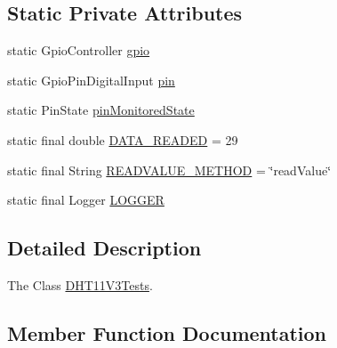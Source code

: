 \subsection*{Static Private Attributes}
\begin{DoxyCompactItemize}
\item 
static Gpio\+Controller \hyperlink{classcom_1_1libsensorj_1_1concretesensor_1_1test_1_1DHT11V3Tests_a21c4675809d99d4752ae63d03d6bc519}{gpio}
\item 
static Gpio\+Pin\+Digital\+Input \hyperlink{classcom_1_1libsensorj_1_1concretesensor_1_1test_1_1DHT11V3Tests_aa313c38ed46c638515f7f43b5458f728}{pin}
\item 
static Pin\+State \hyperlink{classcom_1_1libsensorj_1_1concretesensor_1_1test_1_1DHT11V3Tests_a326b78365c6bfa39eea9b86c28a6b780}{pin\+Monitored\+State}
\item 
static final double \hyperlink{classcom_1_1libsensorj_1_1concretesensor_1_1test_1_1DHT11V3Tests_a2f2801f413ed01cd67cb5acf6cce2d80}{D\+A\+T\+A\+\_\+\+R\+E\+A\+D\+E\+D} = 29
\item 
static final String \hyperlink{classcom_1_1libsensorj_1_1concretesensor_1_1test_1_1DHT11V3Tests_abe087b3362924a1e965cf433b504d948}{R\+E\+A\+D\+V\+A\+L\+U\+E\+\_\+\+M\+E\+T\+H\+O\+D} = \char`\"{}read\+Value\char`\"{}
\item 
static final Logger \hyperlink{classcom_1_1libsensorj_1_1concretesensor_1_1test_1_1DHT11V3Tests_a1520ba3dc702c464bb28690691848a0a}{L\+O\+G\+G\+E\+R}
\end{DoxyCompactItemize}


\subsection{Detailed Description}
The Class \hyperlink{classcom_1_1libsensorj_1_1concretesensor_1_1test_1_1DHT11V3Tests}{D\+H\+T11\+V3\+Tests}. 

\subsection{Member Function Documentation}
\hypertarget{classcom_1_1libsensorj_1_1concretesensor_1_1test_1_1DHT11V3Tests_a825eabc3f80c23c602ce09fc99b1b277}{}
